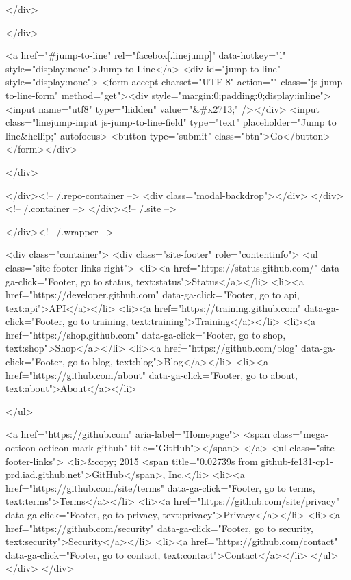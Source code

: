   </div>

</div>

<a href="#jump-to-line" rel="facebox[.linejump]" data-hotkey="l" style="display:none">Jump to Line</a>
<div id="jump-to-line" style="display:none">
  <form accept-charset="UTF-8" action="" class="js-jump-to-line-form" method="get"><div style="margin:0;padding:0;display:inline"><input name="utf8" type="hidden" value="&#x2713;" /></div>
    <input class="linejump-input js-jump-to-line-field" type="text" placeholder="Jump to line&hellip;" autofocus>
    <button type="submit" class="btn">Go</button>
</form></div>

        </div>

      </div><!-- /.repo-container -->
      <div class="modal-backdrop"></div>
    </div><!-- /.container -->
  </div><!-- /.site -->


    </div><!-- /.wrapper -->

      <div class="container">
  <div class="site-footer" role="contentinfo">
    <ul class="site-footer-links right">
        <li><a href="https://status.github.com/" data-ga-click="Footer, go to status, text:status">Status</a></li>
      <li><a href="https://developer.github.com" data-ga-click="Footer, go to api, text:api">API</a></li>
      <li><a href="https://training.github.com" data-ga-click="Footer, go to training, text:training">Training</a></li>
      <li><a href="https://shop.github.com" data-ga-click="Footer, go to shop, text:shop">Shop</a></li>
        <li><a href="https://github.com/blog" data-ga-click="Footer, go to blog, text:blog">Blog</a></li>
        <li><a href="https://github.com/about" data-ga-click="Footer, go to about, text:about">About</a></li>

    </ul>

    <a href="https://github.com" aria-label="Homepage">
      <span class="mega-octicon octicon-mark-github" title="GitHub"></span>
</a>
    <ul class="site-footer-links">
      <li>&copy; 2015 <span title="0.02739s from github-fe131-cp1-prd.iad.github.net">GitHub</span>, Inc.</li>
        <li><a href="https://github.com/site/terms" data-ga-click="Footer, go to terms, text:terms">Terms</a></li>
        <li><a href="https://github.com/site/privacy" data-ga-click="Footer, go to privacy, text:privacy">Privacy</a></li>
        <li><a href="https://github.com/security" data-ga-click="Footer, go to security, text:security">Security</a></li>
        <li><a href="https://github.com/contact" data-ga-click="Footer, go to contact, text:contact">Contact</a></li>
    </ul>
  </div>
</div>


